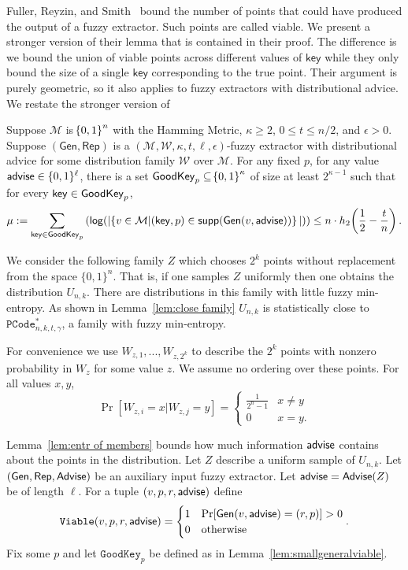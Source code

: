 Fuller, Reyzin, and Smith~\cite{fuller2016fuzzy,fuller2020fuzzy} bound the number of points that could have produced the output of a fuzzy extractor.  Such points are called viable.  We present a stronger version of their lemma that is contained in their proof.  The difference is we bound the union of viable points across different values of $\mathsf{key}$ while they only bound the size of a single $\mathsf{key}$ corresponding to the true point.  Their argument is purely geometric, so it also applies to fuzzy extractors with distributional advice. 
We restate the stronger version of \cite[Lemma 5.2]{fuller2020fuzzy} 

\begin{lemma}
    \label{lem:smallgeneralviable}
    Suppose $\mathcal{M}$ is $\!\left\{ 0,1 \right\}^{n}$ with the Hamming Metric, $\kappa \geq 2$, $0 \leq t \leq n/2$, and $\epsilon > 0$. 
    Suppose $(\mathsf{Gen, Rep})$ is a $(\mathcal{M,W},\kappa, t, \ell, \epsilon)$-fuzzy extractor with distributional advice for some distribution family $\mathcal{W}$ over $\mathcal{M}$. 
    For any fixed $p$, for any value ${\mathsf{advise}} \in \{0, 1\}^\ell$, there is a set $\mathsf{GoodKey}_p \subseteq \!\left\{ 0,1 \right\}^{\kappa}$ of size at least $2^{\kappa - 1}$ such that for every $\mathsf{key} \in \mathsf{GoodKey}_p$,
    \[
      \mu:= \sum_{\mathsf{key} \in \mathsf{GoodKey}_p} \left( \mathsf{log}\!\left(|\!\left\{ v \in \mathcal{M}|\!\left(\mathsf{key}, p\right) \in \mathsf{supp}\!\left(\mathsf{Gen}(v, {\mathsf{advise}})\right) \right\}|\right)\right) \leq n \cdot h_2\!\left(\frac{1}{2} - \frac{t}{n}\right).
    \]   
\end{lemma}

We consider the following family $Z$ which chooses $2^k$ points without replacement from the space $\{0,1\}^n$.  That is, if one samples $Z$ uniformly then one obtains the distribution $U_{n,k}$. There are distributions in this family with little fuzzy min-entropy.  As shown in Lemma~\ref{lem:close family} $U_{n,k}$  is statistically close to $\mathtt{PCode}_{n, k, t, \gamma}^{*}$, a family with fuzzy min-entropy. 

For convenience we use $W_{z, 1},..., W_{z,2^k}$ to describe the $2^k$ points with nonzero probability in $W_z$ for some value $z$.  We assume no ordering over these points.  For all values $x, y$, 
\[
\Pr[W_{z, i} =x | W_{z, j} = y] = \begin{cases} \frac{1}{2^n-1} &x\neq y\\0&x=y.\end{cases}
\]

Lemma~\ref{lem:entr of members} bounds how much information ${\mathsf{advise}}$ contains about the points in the distribution.  Let $Z$ describe a uniform sample of $U_{n,k}$.  Let $({\mathsf{Gen}}, {\mathsf{Rep}}, {\mathsf{Advise}})$ be an auxiliary input fuzzy extractor.  Let ${\mathsf{advise}} = {\mathsf{Advise}}(Z)$ be of length $\ell$.  For a tuple $(v, p, r, {\mathsf{advise}})$ define 
\[
\mathtt{Viable}(v, p, r, {\mathsf{advise}}) = \begin{cases} 1& \Pr[{\mathsf{Gen}}(v, {\mathsf{advise}}) = (r, p)]>0\\0&\text{otherwise}\end{cases}.\]
Fix some $p$ and let $\mathtt{GoodKey}_p$ be defined as in Lemma~\ref{lem:smallgeneralviable}. 

